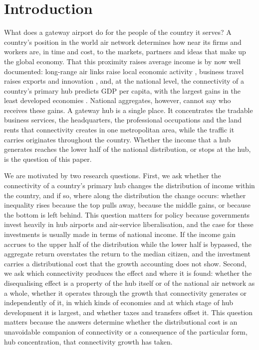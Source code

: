 \linenumbers

\section{Introduction}
\label{sec:intro}
What does a gateway airport do for the people of the country it serves? A country's position in the world air network determines how near its firms and workers are, in time and cost, to the markets, partners and ideas that make up the global economy. That this proximity raises average income is by now well documented: long-range air links raise local economic activity \citep{Campante_2018}, business travel raises exports and innovation \citep{Cristea_2011,Hovhannisyan_2015}, and, at the national level, the connectivity of a country's primary hub predicts GDP per capita, with the largest gains in the least developed economies \citep{Yue_2026}. National aggregates, however, cannot say who receives these gains. A gateway hub is a single place. It concentrates the tradable business services, the headquarters, the professional occupations and the land rents that connectivity creates in one metropolitan area, while the traffic it carries originates throughout the country. Whether the income that a hub generates reaches the lower half of the national distribution, or stops at the hub, is the question of this paper.

We are motivated by two research questions. First, we ask whether the connectivity of a country's primary hub changes the distribution of income within the country, and if so, where along the distribution the change occurs: whether inequality rises because the top pulls away, because the middle gains, or because the bottom is left behind. This question matters for policy because governments invest heavily in hub airports and air-service liberalisation, and the case for these investments is usually made in terms of national income. If the income gain accrues to the upper half of the distribution while the lower half is bypassed, the aggregate return overstates the return to the median citizen, and the investment carries a distributional cost that the growth accounting does not show. Second, we ask which connectivity produces the effect and where it is found: whether the disequalising effect is a property of the hub itself or of the national air network as a whole, whether it operates through the growth that connectivity generates or independently of it, in which kinds of economies and at which stage of hub development it is largest, and whether taxes and transfers offset it. This question matters because the answers determine whether the distributional cost is an unavoidable companion of connectivity or a consequence of the particular form, hub concentration, that connectivity growth has taken.

